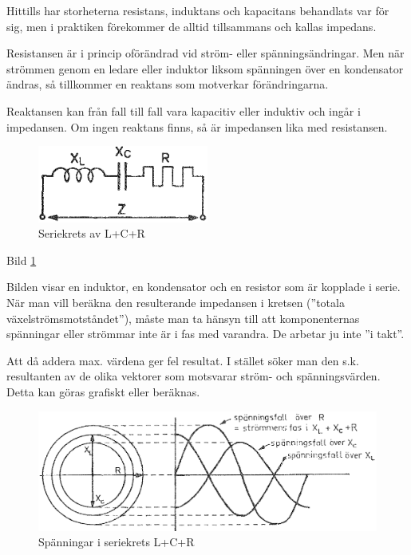 Hittills har storheterna resistans, induktans och kapacitans behandlats var för
sig, men i praktiken förekommer de alltid tillsammans och kallas impedans.

Resistansen är i princip oförändrad vid ström- eller spänningsändringar. Men när
strömmen genom en ledare eller induktor liksom spänningen över en kondensator
ändras, så tillkommer en reaktans som motverkar förändringarna.

Reaktansen kan från fall till fall vara kapacitiv eller induktiv och ingår i
impedansen. Om ingen reaktans finns, så är impedansen lika med resistansen.

\begin{figure}
\includegraphics[width=0.5\textwidth]{images/bild_2_3-12.png}
\caption{Seriekrets av L+C+R}
\label{fig:BildII3-12}
\end{figure}

Bild \ref{fig:BildII3-12}

Bilden visar en induktor, en kondensator och en resistor som är kopplade i
serie. När man vill beräkna den resulterande impedansen i kretsen
(''totala växelströmsmotståndet''), måste man ta hänsyn till att komponenternas
spänningar eller strömmar inte är i fas med varandra. De arbetar ju inte
''i takt''.

Att då addera max. värdena ger fel resultat. I stället söker man den s.k.
resultanten av de olika vektorer som motsvarar ström- och spänningsvärden.
Detta kan göras grafiskt eller beräknas.

\begin{figure}
\includegraphics[width=\textwidth]{images/bild_2_3-13.png}
\caption{Spänningar i seriekrets L+C+R}
\label{fig:BildII3-13}
\end{figure}

